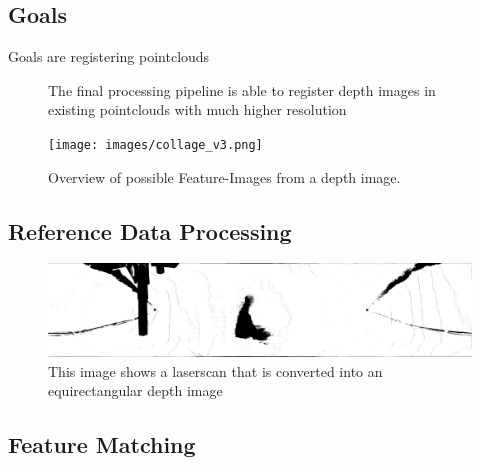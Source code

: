 \documentclass[doktyp=marbeit,fontsize=12pt,sprache=english,draft=true,hausschrift=true,fleqn]{TUBAFarbeiten}
\begin{document}
\maketitle

\TUBAFErklaerungsseite%
\tableofcontents
\newpage

\printglossary[type=\acronymtype]%
\newpage

\printglossary[type=symbols]%
\glsaddallunused[symbols]
\newpage


\subsection{Goals}

Goals are registering pointclouds

\begin{figure}[H]
    
	\caption[Flowchart of final processing pipeline]{The final processing pipeline is able to register depth images in existing pointclouds with much higher resolution}
\end{figure}

\begin{figure}[H]
    \centering
    \texttt{[image: images/collage\_v3.png]}
    \caption{Overview of possible Feature-Images from a depth image.}
\end{figure}

\subsection{Reference Data Processing}

\begin{figure}[H]
	\includegraphics[width=\linewidth]{images/bild1.png}
	\caption[Laserscan as equirectangular depth image]{This image shows a laserscan that is converted into an equirectangular depth image}
\end{figure}

\subsection{Feature Matching}
\end{document}
